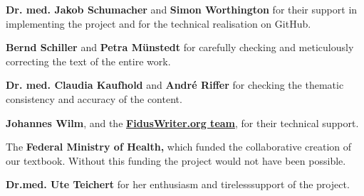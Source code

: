\documentclass{article}
\begin{document}
\textbf{Dr. med. Jakob Schumacher }and\textbf{ Simon Worthington }for their support in\textbf{ }implementing the project and for the technical realisation on GitHub.


\textbf{Bernd Schiller }and\textbf{ Petra Münstedt }for carefully checking and meticulously correcting the text of the\textbf{ }entire work.


\textbf{Dr. med. Claudia Kaufhold }and\textbf{ André Riffer }for checking the thematic consistency and accuracy of the content.


\textbf{Johannes Wilm}, and the\textbf{ }\textbf{\href{https://www.fiduswriter.org/who-we-are/}{FidusWriter.org team}},\textbf{ }for their technical\textbf{ }support.


The \textbf{Federal Ministry of Health,} which funded the collaborative creation of our textbook. Without this funding the project would not have been possible.


\textbf{Dr.med. Ute Teichert }for her enthusiasm and tirelesssupport of the project.
\end{document}
